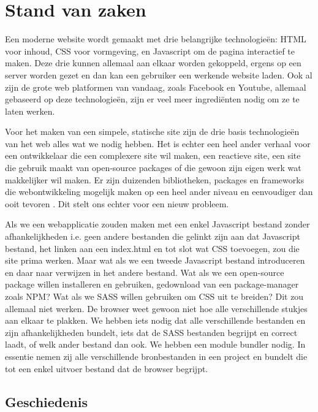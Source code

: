 \chapter{Stand van zaken}
\label{ch:stand-van-zaken}

Een moderne website wordt gemaakt met drie belangrijke technologieën: \gls{HTML} voor inhoud, \gls{CSS} voor vormgeving, en \gls{Javascript} om de pagina interactief te maken. Deze drie kunnen allemaal aan elkaar worden gekoppeld, ergens op een server worden gezet en dan kan een gebruiker een werkende website laden. Ook al zijn de grote web platformen van vandaag, zoals Facebook en Youtube, allemaal gebaseerd op deze technologieën, zijn er veel meer ingrediënten nodig om ze te laten werken.

Voor het maken van een simpele, statische site zijn de drie basis technologieën
 van het web alles wat we nodig hebben. Het is echter een heel ander verhaal voor een ontwikkelaar die een complexere site wil maken, een reactieve site, een site die gebruik maakt van \gls{open-source} \gls{packages} of die gewoon zijn eigen werk wat makkelijker wil maken. Er zijn duizenden bibliotheken, \gls{packages} en frameworks die webontwikkeling mogelijk maken op een heel ander niveau en eenvoudiger dan ooit tevoren \autocite{npm-no-date}. Dit stelt ons echter voor een nieuw probleem. 

Als we een webapplicatie zouden maken met een enkel \gls{Javascript} bestand zonder afhankelijkheden i.e. geen andere bestanden die gelinkt zijn aan dat \gls{Javascript} bestand, het linken aan een index.html en tot slot wat \gls{CSS} toevoegen, zou die site prima werken. Maar wat als we een tweede \gls{Javascript} bestand introduceren en daar naar verwijzen in het andere bestand. Wat als we een \gls{open-source} package willen installeren en gebruiken, gedownload van een \gls{package-manager} zoals NPM? Wat als we \gls{SASS} willen gebruiken om \gls{CSS} uit te breiden? Dit zou allemaal niet werken. De browser weet gewoon niet hoe alle verschillende stukjes aan elkaar te plakken.
We hebben iets nodig dat alle verschillende  bestanden en zijn afhankelijkheden bundelt, iets dat de \gls{SASS} bestanden begrijpt en correct laadt, of welk ander bestand dan ook. We hebben een module bundler nodig. In essentie nemen zij alle verschillende bronbestanden in een project en bundelt die tot een enkel uitvoer bestand dat de browser begrijpt.

\section{Geschiedenis}

